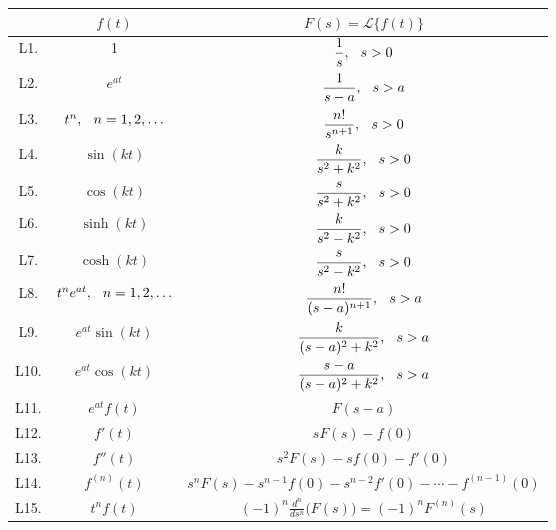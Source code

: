 \documentclass[12pt]{article}
\newcommand{\ds}{\displaystyle}
\renewcommand{\L}{\mathscr{L}}
\begin{document}
\begin{center}
 \hspace{0.25cm}

\begin{tabular}{|c|c|c|}
\hline
	& $f(t)$ 								& $F(s) = \L\{ f(t) \}$ \\
\hline
\hline
L1.	& 1									& $\ds \frac{1}{s},  \hspace{0.25cm}s>0$\\
\hline
L2.	& $e^{at}$								& $\ds \frac{1}{s-a},  \hspace{0.25cm}s>a$\\
\hline
L3.	& $t^n, \hspace{0.25cm}n = 1, 2, \ldots$		& $\ds \frac{n!}{s^{n+1}},  \hspace{0.25cm}s>0$\\
\hline
L4.	& $\sin (kt)$							& $\ds \frac{k}{s^2 + k^2},  \hspace{0.25cm}s>0$\\
\hline
L5.	& $\cos(kt)$							& $\ds \frac{s}{s^2 + k^2},  \hspace{0.25cm}s>0$\\
\hline
L6.	& $\sinh (kt)$							& $\ds \frac{k}{s^2 - k^2},  \hspace{0.25cm}s>0$\\
\hline
L7.	& $\cosh(kt)$							& $\ds \frac{s}{s^2 - k^2},  \hspace{0.25cm}s>0$\\
\hline
L8.	& $t^n e^{at},  \hspace{0.25cm}n = 1, 2, \ldots$	& $\ds \frac{n!}{(s-a)^{n+1}},  \hspace{0.25cm}s>a$\\
\hline
L9.	& $e^{at} \sin(kt)$						& $\ds \frac{k}{(s-a)^2 + k^2},  \hspace{0.25cm}s>a$\\
\hline
L10.	& $e^{at} \cos(kt)$						& $\ds \frac{s-a}{(s-a)^2 + k^2},  \hspace{0.25cm}s>a$\\
\hline
L11.	& $e^{at}f(t)$							& $F(s-a)$\\
\hline
L12.	& $f'(t)$								& $sF(s) - f(0)$\\
\hline
L13.	& $f''(t)$								& $s^2 F(s) - sf(0) - f'(0)$\\
\hline
L14.	& $f^{(n)}(t)$							& $s^n F(s) - s^{n-1}f(0) - s^{n-2}f'(0) - \cdots - f^{(n-1)}(0)$\\
\hline
L15.	& $t^n f(t)$							& $\ds (-1)^n\frac{d^n}{ds^n}\big( F(s) \big) = (-1)^nF^{(n)}(s)$\\
\hline
\hline
\end{tabular}
\end{center}
\end{document}
